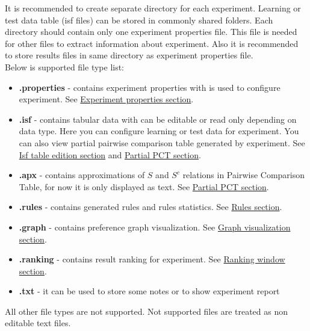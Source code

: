 It is recommended to create separate directory for each experiment. Learning or test data table (isf files) can be stored in commonly shared folders. Each directory should contain only one experiment properties file. This file is needed for other files to extract information about experiment. Also it is recommended to store results files in same directory as experiment properties file.\\

Below is supported file type list:
\begin{itemize}
	\item \textbf{.properties} - contains experiment properties with is used to configure experiment. See \hyperref[section:properties]{Experiment properties section}.
	\item \textbf{.isf} - contains tabular data with can be editable or read only depending on data type. Here you can configure learning or test data for experiment. You can also view partial pairwise comparison table generated by experiment.
	See \hyperref[section:isf-table]{Isf table edition section} and  \hyperref[sub:pct-isf]{Partial PCT section}.
	\item \textbf{.apx} - contains approximations of $S$ and $S^{c}$ relations in Pairwise Comparison Table, for now it is only displayed as text.
	See \hyperref[sub:pct-apx]{Partial PCT section}.
	\item \textbf{.rules} - contains generated rules and rules statistics.
	See \hyperref[section:rules]{Rules section}.
	\item \textbf{.graph} - contains preference graph visualization.
	See \hyperref[section:graph]{Graph visualization section}.
	\item \textbf{.ranking} - contains result ranking for experiment.
	See \hyperref[section:ranking]{Ranking window section}.
	\item \textbf{.txt} - it can be used to store some notes or to show experiment report
\end{itemize}

All other file types are not supported. Not supported files are treated as non editable text files.

\vfill\newpage